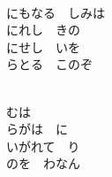 \documentclass[10pt,b5j]{tarticle} %
\begin{document}
\begin{enumerate}
\begin{minipage}[c]{\blocksize}
        \vspace{\linespace}
        \item~\\
        にもなる　しみは\\
        にれし　きの\\
        にせし　いを\\
        らとる　このぞ
        
        \vspace{\linespace}
        \item~\\
        むは　\\
        らがは　に\\
        いがれて　り\\
        のを　わなん
    
    \end{minipage}
\end{enumerate} %
\end{document}
